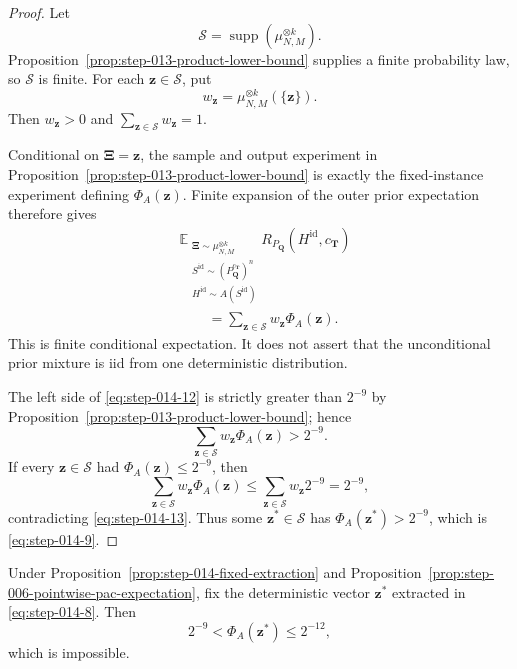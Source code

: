 \begin{proof}
Let
\[
\mathcal S=\operatorname{supp}(\mu_{N,M}^{\otimes k}).
\tag{S14.10}\label{eq:step-014-10}
\]
Proposition~\ref{prop:step-013-product-lower-bound} supplies a finite
probability law, so
\(\mathcal S\) is finite. For each \(\boldsymbol z\in\mathcal S\), put
\[
w_{\boldsymbol z}=\mu_{N,M}^{\otimes k}(\{\boldsymbol z\}).
\tag{S14.11}\label{eq:step-014-11}
\]
Then \(w_{\boldsymbol z}>0\) and
\(\sum_{\boldsymbol z\in\mathcal S}w_{\boldsymbol z}=1\).

Conditional on \(\boldsymbol\Xi=\boldsymbol z\), the sample and output
experiment in Proposition~\ref{prop:step-013-product-lower-bound}
is exactly the fixed-instance experiment defining \(\Phi_A(\boldsymbol z)\).
Finite expansion of the outer prior expectation therefore gives
\[
\begin{aligned}
&\mathbb E_{\substack{
  \boldsymbol\Xi\sim\mu_{N,M}^{\otimes k}\\
  S^{\mathrm{id}}\sim(P_{\boldsymbol Q}^{c_{\boldsymbol T}})^n\\
  H^{\mathrm{id}}\sim A(S^{\mathrm{id}})}}
  R_{P_{\boldsymbol Q}}(H^{\mathrm{id}},c_{\boldsymbol T})\\
&\qquad=\sum_{\boldsymbol z\in\mathcal S}
  w_{\boldsymbol z}\Phi_A(\boldsymbol z).
\end{aligned}
\tag{S14.12}\label{eq:step-014-12}
\]
This is finite conditional expectation. It does not assert that the
unconditional prior mixture is iid from one deterministic distribution.

The left side of \eqref{eq:step-014-12} is strictly greater than \(2^{-9}\) by Proposition~\ref{prop:step-013-product-lower-bound}; hence
\[
\sum_{\boldsymbol z\in\mathcal S}w_{\boldsymbol z}\Phi_A(\boldsymbol z)
>2^{-9}.
\tag{S14.13}\label{eq:step-014-13}
\]
If every \(\boldsymbol z\in\mathcal S\) had
\(\Phi_A(\boldsymbol z)\le2^{-9}\), then
\[
\sum_{\boldsymbol z\in\mathcal S}w_{\boldsymbol z}\Phi_A(\boldsymbol z)
\le\sum_{\boldsymbol z\in\mathcal S}w_{\boldsymbol z}2^{-9}
=2^{-9},
\tag{S14.14}\label{eq:step-014-14}
\]
contradicting \eqref{eq:step-014-13}. Thus some \(\boldsymbol z^*\in\mathcal S\) has
\(\Phi_A(\boldsymbol z^*)>2^{-9}\), which is \eqref{eq:step-014-9}. \end{proof}

\begin{proposition}\label{prop:step-014-fixed-contradiction}
Under Proposition~\ref{prop:step-014-fixed-extraction} and Proposition~\ref{prop:step-006-pointwise-pac-expectation}, fix the
deterministic vector \(\boldsymbol z^*\) extracted in \eqref{eq:step-014-8}. Then
\[
2^{-9}<\Phi_A(\boldsymbol z^*)\le2^{-12},
\tag{S14.15}\label{eq:step-014-15}
\]
which is impossible.
\end{proposition}

